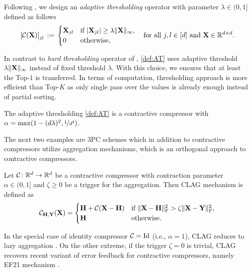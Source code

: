 \documentclass[11pt]{article}
\begin{document}
	
	\begin{example}\label{ex:AT}
		Following \citet{Sahu2021threshold}, we design an {\em adaptive thresholding} operator with parameter $\lambda \in (0,1]$ defined as follows
		\begin{equation}\label{def:AT}
			\left[{\mathcal{C}}(\mathbf{X})\right]_{jl} \; { := }\;
			\begin{cases}
				\mathbf{X}_{jl} & \text{if } |\mathbf{X}_{jl}| \geq \lambda\|\mathbf{X}\|_\infty, \\
				0 & \text{otherwise},
			\end{cases}
			\quad \text{for all } j,l\in[d] \text{ and } \mathbf{X}\in\mathbb{R}^{d\times d}.
		\end{equation}
	\end{example}
	In contrast to {\em hard thresholding} operator of \citet{Sahu2021threshold}, \eqref{def:AT} uses adaptive threshold $\lambda\|\mathbf{X}\|_\infty$ instead of fixed threshold $\lambda$. With this choice, we ensures that at least the Top-$1$ is transferred. In terms of computation, thresholding approach is more efficient than Top-$K$ as only single pass over the values is already enough instead of partial sorting.
	
	\begin{lemma}\label{lem:3PC__AT}
		The adaptive thresholding \eqref{def:AT} is a contractive compressor with $\alpha = \max(1-(d\lambda)^2,\nicefrac{1}{d^2})$.
	\end{lemma}
	
	The next two examples are 3PC schemes which in addition to contractive compressors utilize aggregation mechanisms, which is an orthogonal approach to contractive compressors.
	
	\begin{example}\label{ex:CLAG}
		Let ${\mathcal{C}}\colon\mathbb{R}^d\to\mathbb{R}^d$ be a contractive compressor with contraction parameter $\alpha\in(0,1]$ and $\zeta\ge0$ be a trigger for the aggregation. Then CLAG mechanism is defined as
		\begin{equation}\label{def:3PC__CLAG}
			{\mathcal{C}}_{\mathbf{H},\mathbf{Y}}(\mathbf{X}) = 
			\begin{cases}
				\mathbf{H} + {\mathcal{C}}(\mathbf{X}-\mathbf{H}) & \text{if } \|\mathbf{X}-\mathbf{H}\|^2_{\rm F} > \zeta\|\mathbf{X}-\mathbf{Y}\|^2_{\rm F}, \\
				\mathbf{H} & \text{otherwise}.
			\end{cases}
		\end{equation}
	\end{example}
	In the special case of identity compressor ${\mathcal{C}}=\textrm{Id}$ (i.e., $\alpha=1$), CLAG reduces to lazy aggregation \citep{Chen2018LAG}. On the other extreme, if the trigger $\zeta=0$ is trivial, CLAG recovers recent variant of error feedback for contractive compressors, namely EF21 mechanism \citep{EF21}.
	
\end{document}
